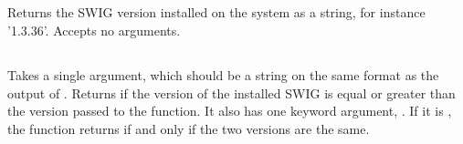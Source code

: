 \subsection[get\_swig\_version]{}
Returns the SWIG version installed on the system as a string, for instance
'1.3.36'. Accepts no arguments.


\subsection[check\_swig\_version]{}
Takes a single argument, which should be a string on the same format as the
output of . Returns  if the version of the
installed SWIG is equal or greater than the version passed to the function. It
also has one keyword argument, . If it is , the function
returns  if and only if the two versions are the same.




